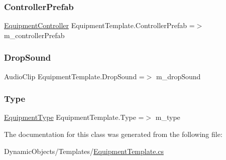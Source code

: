 \subsubsection{\texorpdfstring{Controller\+Prefab}{ControllerPrefab}}
{\footnotesize\ttfamily \mbox{\hyperlink{class_equipment_controller}{Equipment\+Controller}} Equipment\+Template.\+Controller\+Prefab =$>$ m\+\_\+controller\+Prefab}

\mbox{\label{class_equipment_template_a2e22963c9802dc299435eaab31bc9cc8}} 
\subsubsection{\texorpdfstring{Drop\+Sound}{DropSound}}
{\footnotesize\ttfamily Audio\+Clip Equipment\+Template.\+Drop\+Sound =$>$ m\+\_\+drop\+Sound}

\mbox{\label{class_equipment_template_a9c4a46351a20f28c4054c18af7a9f256}} 
\subsubsection{\texorpdfstring{Type}{Type}}
{\footnotesize\ttfamily \mbox{\hyperlink{class_equipment_template_ad390a9e6257d1d050f5d5fb5a8756633}{Equipment\+Type}} Equipment\+Template.\+Type =$>$ m\+\_\+type}



The documentation for this class was generated from the following file\+:\begin{DoxyCompactItemize}
\item 
Dynamic\+Objects/\+Templates/\mbox{\hyperlink{_equipment_template_8cs}{Equipment\+Template.\+cs}}\end{DoxyCompactItemize}
